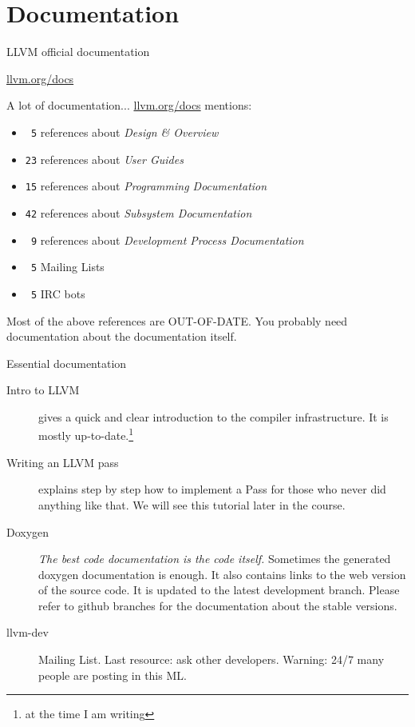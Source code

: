 
\section{Documentation}
\begin{frame}[t]{LLVM official documentation}
  \begin{center}
    \begin{Huge}
      \vfill
      \url{llvm.org/docs}
      \vfill
    \end{Huge}
  \end{center}
\end{frame}

\begin{frame}[t]{A lot of documentation...}
  \url{llvm.org/docs} mentions:
  \begin{itemize}
    \item \texttt{\ 5} references about \textit{Design \& Overview}
    \item \texttt{23} references about \textit{User Guides}
    \item \texttt{15} references about \textit{Programming Documentation}
    \item \texttt{42} references about \textit{Subsystem Documentation}
    \item \texttt{\ 9} references about \textit{Development Process Documentation}
    \item \texttt{\ 5} Mailing Lists
    \item \texttt{\ 5} IRC bots
  \end{itemize}
  \vfill
  Most of the above references are OUT-OF-DATE.
  \vfill
  You probably need documentation about the documentation itself.
  \vfill
\end{frame}

\begin{frame}[t]{Essential documentation}
  \begin{description}
    \item[Intro to LLVM] \cite{LOCAL:www/llvmIntro}
          gives a quick and clear introduction to the compiler infrastructure.
          It is mostly up-to-date.\footnote{at the time I am writing}
    \vfill
    \item[Writing an LLVM pass] \cite{LOCAL:www/llvmWritingAPass}
          explains step by step how to implement a Pass
          for those who never did anything like that.
          We will see this tutorial later in the course.
    \vfill
    \item[Doxygen] \cite{LOCAL:www/llvmDoxygen}
          \textit{The best code documentation is the code itself.}
          Sometimes the generated doxygen documentation is enough.
          It also contains links to the web version of the source code.
          It is updated to the latest development branch.
          Please refer to github branches for the documentation about the stable versions.
    \vfill
    \item[llvm-dev] Mailing List. Last resource: ask other developers.
          Warning: 24/7 many people are posting in this ML.
  \end{description}
\end{frame}
